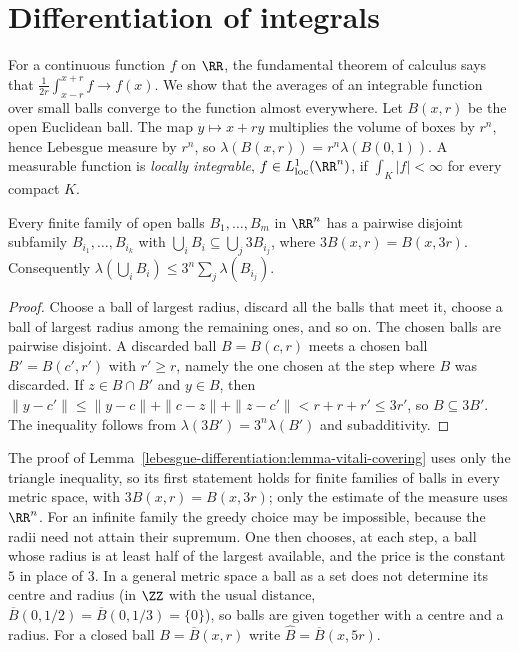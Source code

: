 \section{Differentiation of integrals}\label{lebesgue-differentiation:section-differentiation}

For a continuous function $f$ on $\RR$, the fundamental theorem of calculus says that $\frac{1}{2r}\int_{x-r}^{x+r}f \to f(x)$. We show that the averages of
an integrable function over small balls converge to the function almost everywhere. Let $B(x, r)$ be the open Euclidean ball. The map $y \mapsto x + ry$ multiplies
the volume of boxes by $r^n$, hence Lebesgue measure by $r^n$, so $\lambda(B(x, r)) = r^n\lambda(B(0, 1))$. A measurable function is \emph{locally integrable},
$f \in L^1_{\mathrm{loc}}(\RR^n)$, if $\int_K|f| < \infty$ for every compact $K$.

\begin{lemma}\label{lebesgue-differentiation:lemma-vitali-covering}
Every finite family of open balls $B_1, \ldots, B_m$ in $\RR^n$ has a pairwise disjoint subfamily $B_{i_1}, \ldots, B_{i_k}$ with
$\bigcup_iB_i \subseteq \bigcup_j3B_{i_j}$, where $3B(x, r) = B(x, 3r)$. Consequently $\lambda(\bigcup_iB_i) \leq 3^n\sum_j\lambda(B_{i_j})$.
\end{lemma}

\begin{proof}
Choose a ball of largest radius, discard all the balls that meet it, choose a ball of largest radius among the remaining ones, and so on. The chosen balls are
pairwise disjoint. A discarded ball $B = B(c, r)$ meets a chosen ball $B' = B(c', r')$ with $r' \geq r$, namely the one chosen at the step where $B$ was discarded.
If $z \in B \cap B'$ and $y \in B$, then $\|y - c'\| \leq \|y - c\| + \|c - z\| + \|z - c'\| < r + r + r' \leq 3r'$, so $B \subseteq 3B'$. The inequality follows from
$\lambda(3B') = 3^n\lambda(B')$ and subadditivity.
\end{proof}

The proof of Lemma~\ref{lebesgue-differentiation:lemma-vitali-covering} uses only the triangle inequality, so its first statement holds for finite families of balls in every metric space, with
$3B(x, r) = B(x, 3r)$; only the estimate of the measure uses $\RR^n$. For an infinite family the greedy choice may be impossible, because the radii need not attain their supremum. One then chooses,
at each step, a ball whose radius is at least half of the largest available, and the price is the constant $5$ in place of $3$. In a general metric space a ball as a set does not determine its centre
and radius (in $\ZZ$ with the usual distance, $\overline{B}(0, 1/2) = \overline{B}(0, 1/3) = \{0\}$), so balls are given together with a centre and a radius. For a closed ball
$B = \overline{B}(x, r)$ write $\widehat{B} = \overline{B}(x, 5r)$.

